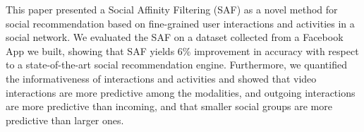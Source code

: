 
This paper presented a Social Affinity Filtering (SAF) as a novel method
for social recommendation based on fine-grained user interactions and
activities in a social network. We evaluated the SAF on a dataset collected 
from a Facebook App we built, showing that SAF yields 6\% improvement
in accuracy with respect to a state-of-the-art social recommendation engine.
Furthermore, we quantified the informativeness of 
interactions and activities and showed that video interactions
 are more predictive among the modalities, and outgoing interactions 
are more predictive than incoming, and that smaller social groups are more predictive than
larger ones. 



